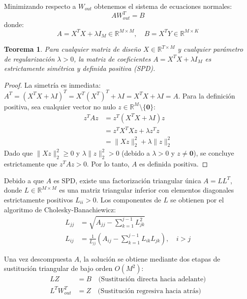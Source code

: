 \documentclass[10pt,twocolumn]{article}
\newtheorem{theorem}{Teorema}
\begin{document}
Minimizando respecto a $W_{out}$ obtenemos el sistema de ecuaciones normales:
\begin{equation}
A W_{out}^T = B
\label{eq:normal_eq}
\end{equation}
donde:
\begin{equation}
A = X^T X + \lambda I_M \in \mathbb{R}^{M \times M}, \quad B = X^T Y \in \mathbb{R}^{M \times K}
\end{equation}

\begin{theorem}
Para cualquier matriz de diseño $X \in \mathbb{R}^{T \times M}$ y cualquier parámetro de regularización $\lambda > 0$, la matriz de coeficientes $A = X^T X + \lambda I_M$ es estrictamente simétrica y definida positiva (SPD).
\end{theorem}

\begin{proof}
La simetría es inmediata: $A^T = (X^T X + \lambda I)^T = X^T (X^T)^T + \lambda I = X^T X + \lambda I = A$.
Para la definición positiva, sea cualquier vector no nulo $z \in \mathbb{R}^M \setminus \{\mathbf{0}\}$:
\begin{align}
z^T A z &= z^T (X^T X + \lambda I) z \nonumber \\
&= z^T X^T X z + \lambda z^T z \nonumber \\
&= \|X z\|_2^2 + \lambda \|z\|_2^2
\end{align}
Dado que $\|X z\|_2^2 \ge 0$ y $\lambda \|z\|_2^2 > 0$ (debido a $\lambda > 0$ y $z \ne \mathbf{0}$), se concluye estrictamente que $z^T A z > 0$. Por lo tanto, $A$ es definida positiva.
\end{proof}

Debido a que $A$ es SPD, existe una factorización triangular única $A = L L^T$, donde $L \in \mathbb{R}^{M \times M}$ es una matriz triangular inferior con elementos diagonales estrictamente positivos $L_{ii} > 0$. Los componentes de $L$ se obtienen por el algoritmo de Cholesky-Banachiewicz:
\begin{align}
L_{jj} &= \sqrt{A_{jj} - \sum_{k=1}^{j-1} L_{jk}^2} \\
L_{ij} &= \frac{1}{L_{jj}} \left( A_{ij} - \sum_{k=1}^{j-1} L_{ik} L_{jk} \right), \quad i > j
\end{align}

Una vez descompuesta $A$, la solución se obtiene mediante dos etapas de sustitución triangular de bajo orden $O(M^2)$:
\begin{align}
L Z &= B \quad \text{(Sustitución directa hacia adelante)} \\
L^T W_{out}^T &= Z \quad \text{(Sustitución regresiva hacia atrás)}
\end{align}
\end{document}
